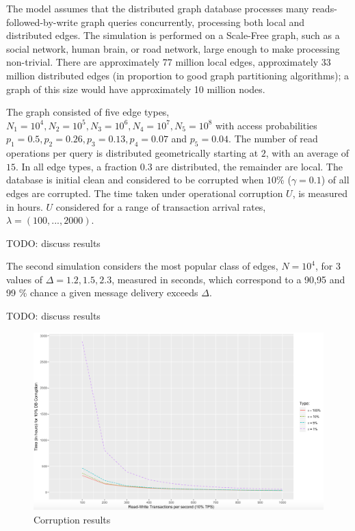 \documentclass[sigplan,10pt]{acmart}
\begin{document}
The model assumes that the distributed graph database  processes many reads-followed-by-write graph queries concurrently, processing both local and distributed edges. The simulation is performed on a Scale-Free graph, such as a social network, human brain, or road network, large enough to make processing non-trivial. There are approximately 77 million local edges, approximately 33 million distributed edges (in proportion to good graph partitioning algorithms); a graph of this size would have approximately 10 million nodes.

The graph consisted of five edge types, $N_1=10^4, N_2=10^5, N_3=10^6, N_4=10^7, N_5=10^8$ with access probabilities $p_1 =0.5, p_2 =0.26, p_3=0.13, p_4=0.07$ and $p_5 =0.04$. The number of read operations per query is distributed geometrically starting at $2$, with an average of $15$. In all edge types, a fraction $0.3$ are distributed, the remainder are local. The database is initial clean and considered to be corrupted when $10$\% ($\gamma = 0.1$) of all edges are corrupted. The time taken under operational corruption $U$, is measured in hours. $U$ considered for a range of transaction arrival rates, $\lambda = (100, ..., 2000)$.

TODO: discuss results

The second simulation considers the most popular class of edges, $N=10^4$, for 3 values of $\Delta = 1.2, 1.5, 2.3$, measured in seconds, which correspond to a 90,95 and 99 \% chance a given message delivery exceeds $\Delta$.

TODO: discuss results

\begin{figure}[h]
  \centering
  \includegraphics[width=\linewidth]{./images/corruption_comparison2}
  \caption{Corruption results}
  \label{results}
\end{figure}
\end{document}
